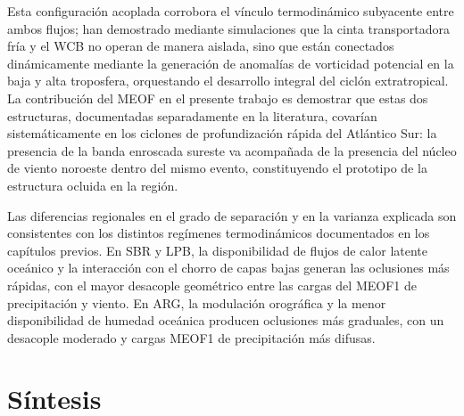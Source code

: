 Esta configuración acoplada corrobora el vínculo termodinámico subyacente entre ambos flujos; \citet{schemm2014linkage} han demostrado mediante simulaciones que la cinta transportadora fría y el WCB no operan de manera aislada, sino que están conectados dinámicamente mediante la generación de anomalías de vorticidad potencial en la baja y alta troposfera, orquestando el desarrollo integral del ciclón extratropical. 
La contribución del MEOF en el presente trabajo es demostrar que estas dos estructuras, documentadas separadamente en la literatura, covarían sistemáticamente en los ciclones de profundización rápida del Atlántico Sur: la presencia de la banda enroscada sureste va acompañada de la presencia del núcleo de viento noroeste dentro del mismo evento, constituyendo el prototipo de la estructura ocluida en la región.

Las diferencias regionales en el grado de separación y en la varianza explicada son consistentes con los distintos regímenes termodinámicos documentados en los capítulos previos. En SBR y LPB, la disponibilidad de flujos de calor latente oceánico y la interacción con el chorro de capas bajas \citep{gramcianinov2019properties} generan las oclusiones más rápidas, con el mayor desacople geométrico entre las cargas del MEOF1 de precipitación y viento. En ARG, la modulación orográfica y la menor disponibilidad de humedad oceánica producen oclusiones más graduales, con un desacople moderado y cargas MEOF1 de precipitación más difusas. 

\section{Síntesis}
\label{sec:sintesis_meof}

